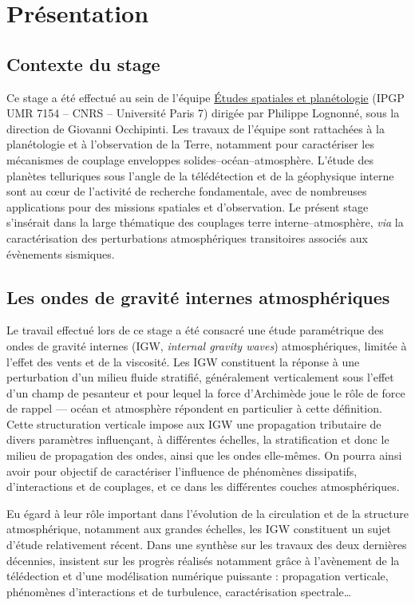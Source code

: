 \section{Présentation}

\subsection{Contexte du stage}

Ce stage a été effectué au sein de l’équipe \hyperref{http://ganymede.ipgp.jussieu.fr}{}{}{Études spatiales et planétologie} (IPGP UMR 7154 -- CNRS -- Université Paris 7) dirigée par Philippe Lognonné, sous la direction de Giovanni Occhipinti. Les travaux de l'équipe sont rattachées à la planétologie et à l'observation de la Terre, notamment pour caractériser les mécanismes de couplage enveloppes solides--océan--atmosphère. L'étude des planètes telluriques sous l'angle de la télédétection et de la géophysique interne sont au cœur de l'activité de recherche fondamentale, avec de nombreuses applications pour des missions spatiales et d'observation. Le présent stage s'insérait dans la large thématique des couplages terre interne--atmosphère, \emph{via} la caractérisation des perturbations atmosphériques transitoires associés aux évènements sismiques.

\subsection{Les ondes de gravité internes atmosphériques}

Le travail effectué lors de ce stage a été consacré une étude paramétrique des ondes de gravité internes (IGW, \emph{internal gravity waves}) atmosphériques, limitée à l'effet des vents et de la viscosité. Les IGW constituent la réponse à une perturbation d'un milieu fluide stratifié, généralement verticalement sous l'effet d'un champ de pesanteur et pour lequel la force d'Archimède joue le rôle de force de rappel — océan et atmosphère répondent en particulier à cette définition. Cette structuration verticale impose aux IGW une propagation tributaire de divers paramètres influençant, à différentes échelles, la stratification et donc le milieu de propagation des ondes, ainsi que les ondes elle-mêmes. On pourra ainsi avoir pour objectif de caractériser l'influence de phénomènes dissipatifs, d'interactions et de couplages, et ce dans les différentes couches atmosphériques.

Eu égard à leur rôle important dans l'évolution de la circulation et de la structure atmosphérique, notamment aux grandes échelles, les IGW constituent un sujet d'étude relativement récent. Dans une synthèse sur les travaux des deux dernières décennies, \cite{Fritts2003} insistent sur les progrès réalisés notamment grâce à l'avènement de la télédection et d'une modélisation numérique puissante : propagation verticale, phénomènes d'interactions et de turbulence, caractérisation spectrale…

